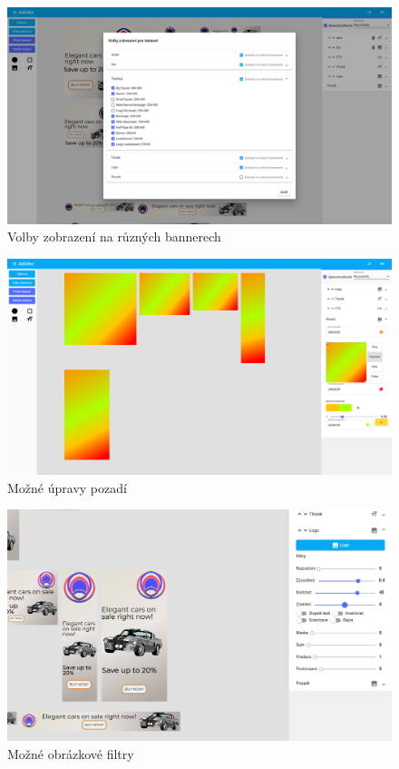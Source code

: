 \documentclass[czech,bachelor]{diploma}
\begin{document}
\begin{figure}[h]
    \includegraphics[width=1.0\textwidth]{Figures/editor/volby-zobrazeni.png}
    \caption{Volby zobrazení na různých bannerech}
    \label{fig:editor:options}
\end{figure}


\begin{figure}[h]
    \includegraphics[width=1.0\textwidth]{Figures/editor/upravy-pozadi.png}
    \caption{Možné úpravy pozadí}
    \label{fig:editor:backgrounds}
\end{figure}



\begin{figure}[h]
    \includegraphics[width=1.0\textwidth]{Figures/editor/obrazkove-filtry.png}
    \caption{Možné obrázkové filtry}
    \label{fig:editor:filters}
\end{figure}
\end{document}
